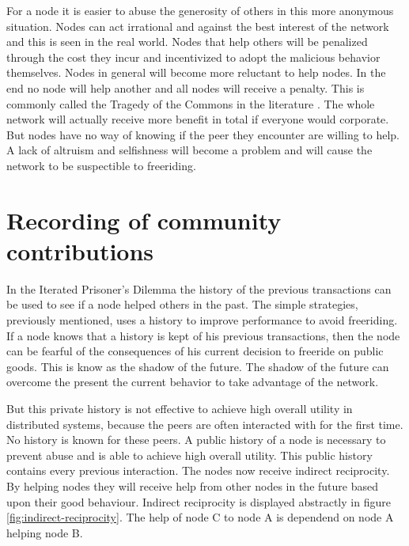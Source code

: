 For a node it is easier to abuse the generosity of others in this more anonymous situation.
Nodes can act irrational and against the best interest of the network
and this is seen in the real world\cite{Adar-Freeriding}.
Nodes that help others will be penalized through the cost they incur
and incentivized to adopt the malicious behavior themselves.
Nodes in general will become more reluctant to help nodes\cite{Nowak-PrisonerDilemma}.
In the end no node will help another and all nodes will receive a penalty.
This is commonly called the Tragedy of the Commons in the literature \cite{hardin-tragedy}.
The whole network will actually receive more benefit in total if everyone would corporate.
But nodes have no way of knowing if the peer they encounter are willing to help.
A lack of altruism and selfishness will become a problem 
and will cause the network to be suspectible to freeriding.

\section{Recording of community contributions}
In the Iterated Prisoner's Dilemma the history of the previous transactions can be used 
to see if a node helped others in the past.
The simple strategies, previously mentioned, uses a history to improve performance
to avoid freeriding.
If a node knows that a history is kept of his previous transactions,
then the node can be fearful of the consequences of his current decision to freeride on public goods.
This is know as the shadow of the future\cite{bo-shadow}.
The shadow of the future can overcome the present the current behavior to take advantage of the network.

But this private history is not effective to achieve high overall utility in distributed systems,
because the peers are often interacted with for the first time.
No history is known for these peers.
A public history of a node is necessary to prevent abuse
and is able to achieve high overall utility\cite{Lai-Incentives}.
This public history contains every previous interaction.
The nodes now receive indirect reciprocity\cite{Nowak-Cooperation}.
By helping nodes they will receive help from other nodes in the future based upon their good behaviour.
Indirect reciprocity is displayed abstractly in figure \ref{fig:indirect-reciprocity}.
The help of node C to node A is dependend on node A helping node B.

